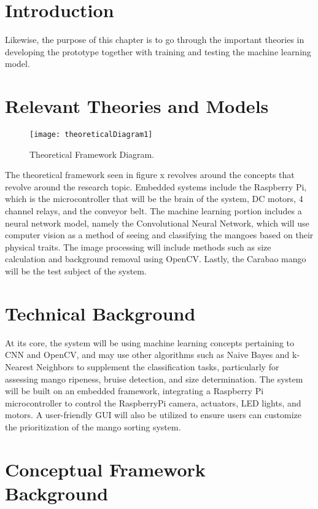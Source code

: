 

\section{Introduction}

Likewise, the purpose of this chapter is to go through the important theories in developing the prototype together with training and testing the machine learning model.

\section{Relevant Theories and Models}

\begin{figure}[!htbp]
	\centering
	\texttt{[image: theoreticalDiagram1]}
	\caption{Theoretical Framework Diagram.}
	\label{fig:theoreticalDiagram1}
\end{figure}


The theoretical framework seen in figure x revolves around the concepts that revolve around the research topic. 
Embedded systems include the Raspberry Pi, which is the microcontroller that will be the brain of the system, 
\gls{DC} motors, 4 channel relays, and the conveyor belt. The machine learning portion includes a neural network 
model, namely the Convolutional Neural Network, which will use computer vision as a method of seeing and classifying
 the mangoes based on their physical traits. The image processing will include methods such as size calculation and 
 background removal using OpenCV. Lastly, the Carabao mango will be the test subject of the system.

\section{Technical Background}

At its core, the system will be using machine learning concepts pertaining to \gls{CNN} and OpenCV, and may use other algorithms such as Naive Bayes and k-Nearest Neighbors to supplement the classification tasks, particularly for assessing mango ripeness, bruise detection, and size determination. The system will be built on an embedded framework, integrating a Raspberry Pi microcontroller to control the RaspberryPi camera, actuators, LED lights, and motors. A user-friendly GUI will also be utilized to ensure users can customize the prioritization of the mango sorting system.

\section{Conceptual Framework Background}


